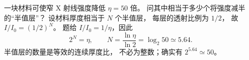 一块材料可使窄 X 射线强度降低
$\eta=50$ 倍。
问其中相当于多少个将强度减半的“半值层”？
\exsolution
设材料厚度相当于 $N$ 个半值层，
每层的透射比例为 $1/2$，
故
$I/I_0=(1/2)^N$。
题给 $I/I_0=1/\eta$，因此
\[
 2^N=\eta,\qquad
 \boxed{N=\frac{\ln\eta}{\ln2}
 =\log_2 50\simeq5.64}.
\]
\excheck 半值层的数量是等效的连续厚度比，
不必为整数；确实有
$2^{5.64}\simeq50$。
